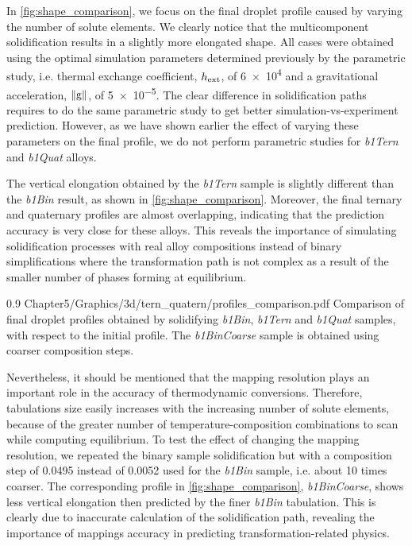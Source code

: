 In \cref{fig:shape_comparison}, we focus on the final droplet profile caused by varying the number of solute elements.
We clearly notice that the multicomponent solidification results in a slightly more elongated shape. 
All cases were obtained using the optimal simulation
parameters determined previously by the parametric study, i.e. thermal exchange coefficient, $h_{\text{ext}}$, of \SI{6e4}{\uhconvec} and a gravitational
acceleration, $\lVert \boldsymbol{\text{g}} \rVert$, of \SI{5e-5}{\uacceleration}. The clear difference in solidification paths requires to do the same 
parametric study to get better simulation-vs-experiment prediction. However, as we have shown earlier the effect of varying these parameters
on the final profile, we do not perform parametric studies for \emph{b1Tern} and \emph{b1Quat} alloys. 

The vertical elongation obtained by the \emph{b1Tern} sample is slightly different than the \emph{b1Bin} result, as shown in \cref{fig:shape_comparison}. 
Moreover, the final ternary and quaternary
profiles are almost overlapping, indicating that the prediction accuracy is very close for these alloys. 
This reveals the importance of simulating solidification processes with real alloy compositions instead of binary simplifications
where the transformation path is not complex as a result of the smaller number of phases forming at equilibrium. 

\begin{figureth}
{0.9}
{Chapter5/Graphics/3d/tern_quatern/profiles_comparison.pdf}
{Comparison of final droplet profiles obtained by solidifying \emph{b1Bin}, \emph{b1Tern} and \emph{b1Quat} samples, with respect to the initial profile. 
The \emph{b1BinCoarse} sample
is obtained using coarser composition steps.}
\label{fig:shape_comparison}
\end{figureth}

Nevertheless, it should be mentioned that the mapping resolution plays an important role in the accuracy of thermodynamic conversions.
Therefore, tabulations size easily increases with the increasing number of solute elements, because of the greater number of temperature-composition 
combinations to scan while computing equilibrium. To test the effect of changing the mapping resolution, we repeated the binary sample solidification
but with a composition step of \SI{0.0495}{\ucomposition} instead of \SI{0.0052}{\ucomposition} used for the \emph{b1Bin} sample, i.e. about 10 times coarser. 
The corresponding profile in \cref{fig:shape_comparison}, \emph{b1BinCoarse}, shows less vertical elongation then predicted by the finer \emph{b1Bin} tabulation. 
This is clearly due to inaccurate calculation of the solidification path, revealing the importance of mappings accuracy in predicting transformation-related physics.

